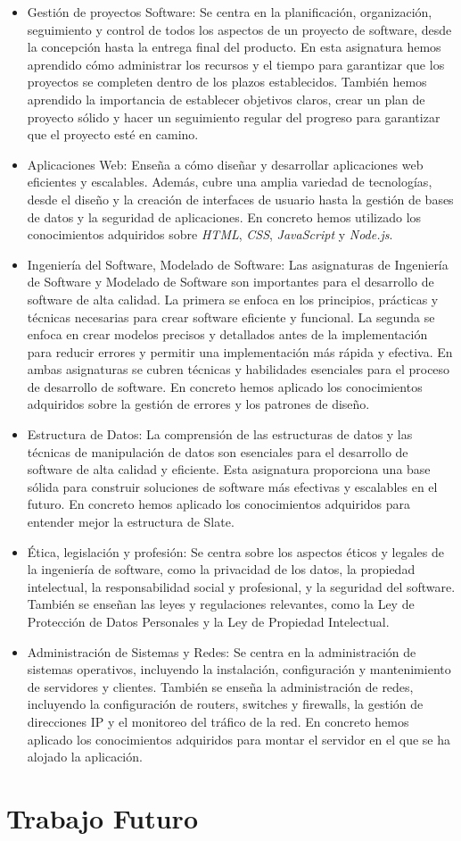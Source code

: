 \begin{itemize}
    \item Gestión de proyectos Software: Se centra en la planificación, organización, seguimiento y control de todos los aspectos de un proyecto de software, desde la concepción hasta la entrega final del producto. En esta asignatura hemos aprendido cómo administrar los recursos y el tiempo para garantizar que los proyectos se completen dentro de los plazos establecidos. También hemos aprendido la importancia de establecer objetivos claros, crear un plan de proyecto sólido y hacer un seguimiento regular del progreso para garantizar que el proyecto esté en camino.
    \item Aplicaciones Web: Enseña a cómo diseñar y desarrollar aplicaciones web eficientes y escalables. Además, cubre una amplia variedad de tecnologías, desde el diseño y la creación de interfaces de usuario hasta la gestión de bases de datos y la seguridad de aplicaciones. En concreto hemos utilizado los conocimientos adquiridos sobre \textit{HTML}, \textit{CSS}, \textit{JavaScript} y \textit{Node.js}.
    \item Ingeniería del Software, Modelado de Software: Las asignaturas de Ingeniería de Software y Modelado de Software son importantes para el desarrollo de software de alta calidad. La primera se enfoca en los principios, prácticas y técnicas necesarias para crear software eficiente y funcional. La segunda se enfoca en crear modelos precisos y detallados antes de la implementación para reducir errores y permitir una implementación más rápida y efectiva. En ambas asignaturas se cubren técnicas y habilidades esenciales para el proceso de desarrollo de software. En concreto hemos aplicado los conocimientos adquiridos sobre la gestión de errores y los patrones de diseño.
    \item Estructura de Datos: La comprensión de las estructuras de datos y las técnicas de manipulación de datos son esenciales para el desarrollo de software de alta calidad y eficiente. Esta asignatura proporciona una base sólida para construir soluciones de software más efectivas y escalables en el futuro. En concreto hemos aplicado los conocimientos adquiridos para entender mejor la estructura de Slate.
    \item Ética, legislación y profesión: Se centra sobre los aspectos éticos y legales de la ingeniería de software, como la privacidad de los datos, la propiedad intelectual, la responsabilidad social y profesional, y la seguridad del software. También se enseñan las leyes y regulaciones relevantes, como la Ley de Protección de Datos Personales y la Ley de Propiedad Intelectual.
    \item Administración de Sistemas y Redes: Se centra en la administración de sistemas operativos, incluyendo la instalación, configuración y mantenimiento de servidores y clientes. También se enseña la administración de redes, incluyendo la configuración de routers, switches y firewalls, la gestión de direcciones IP y el monitoreo del tráfico de la red. En concreto hemos aplicado los conocimientos adquiridos para montar el servidor en el que se ha alojado la aplicación. 
\end{itemize}

\section{Trabajo Futuro}
\label{sec:TrabajoFuturo}